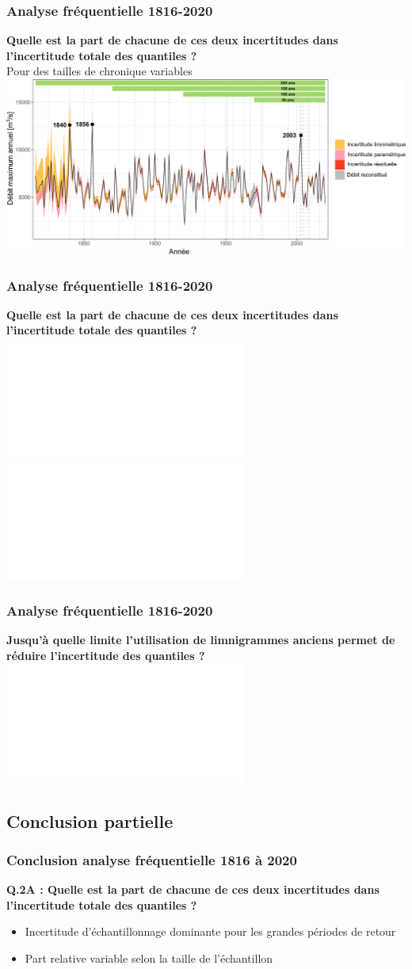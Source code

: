 \documentclass[compress,9pt]{beamer}
\begin{document}
	\begin{frame}[t]
		\frametitle{Analyse fréquentielle 1816-2020}
		\vfill
		\centering
		\textbf{Quelle est la part de chacune de ces deux incertitudes dans l'incertitude totale des quantiles ? }\\
		Pour des tailles de chronique variables\\
		\vfill
		\centering
		\includegraphics[width = .9\textwidth]{./Figures/IC_AMAX_Both_Bands.pdf} 
		\vfill
	\end{frame}
	
	\begin{frame}[t]
		\frametitle{Analyse fréquentielle 1816-2020}
		\vfill
		\centering
		\textbf{Quelle est la part de chacune de ces deux incertitudes dans l'incertitude totale des quantiles ? }\\
		\vfill
		\centering
		\includegraphics<1>[width = .8\textwidth]{./Figures/Ukplot4cases1.pdf}	
		\includegraphics<2>[width = .8\textwidth]{./Figures/Ukplot4cases2.pdf}	
		\vfill
	\end{frame}
	
	\begin{frame}[c]
		\frametitle{Analyse fréquentielle 1816-2020}
		\vfill
		\centering
		\textbf{Jusqu'à quelle limite l'utilisation de limnigrammes anciens permet de réduire l'incertitude des quantiles ?}
		\vfill
		\centering
		\includegraphics<1>[width = .78\textwidth]{./Figures/10e-Q1000SSize.pdf}
	\end{frame}
	
	\subsection{Conclusion partielle} 
	\begin{frame}[t]
		\frametitle{Conclusion analyse fréquentielle 1816 à 2020}
		\vfill
		\centering
		\large{\textbf{Q.2A : Quelle est la part de chacune de ces deux incertitudes dans l'incertitude totale des quantiles ?}}
		\vspace{10pt}
		\begin{itemize}
		\normalsize
			\item<2->[$\vartriangleright$] Incertitude d'échantillonnage dominante pour les grandes périodes de retour
			\vspace{5pt}
			\item<3->[$\vartriangleright$] Part relative variable selon la taille de l'échantillon
		\end{itemize}
		\vfill
	\end{frame}
	
\end{document}
